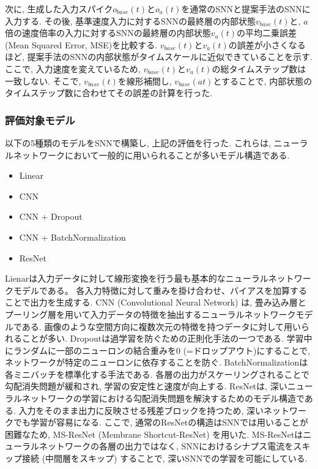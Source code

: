 次に, 生成した入力スパイク$o_{base}(t)$と$o_a(t)$を通常のSNNと提案手法のSNNに入力する.
その後, 基準速度入力に対するSNNの最終層の内部状態$v_{base}(t)$と, $a$倍の速度倍率の入力に対するSNNの最終層の内部状態$v_a(t)$の平均二乗誤差 (Mean Squared Error, MSE)を比較する.
$v_{base}(t)$と$v_a(t)$の誤差が小さくなるほど, 提案手法のSNNの内部状態がタイムスケールに近似できていることを示す.
ここで, 入力速度を変えているため, $v_{base}(t)$と$v_a(t)$の総タイムステップ数は一致しない.
そこで, $v_{base}(t)$を線形補間し, $v_{base}(at)$とすることで, 内部状態のタイムステップ数に合わせてその誤差の計算を行った.

\subsubsection{評価対象モデル}
以下の5種類のモデルをSNNで構築し, 上記の評価を行った.
これらは, ニューラルネットワークにおいて一般的に用いられることが多いモデル構造である.
\begin{itemize}
    \item Linear
    \item CNN\cite{cnn}
    \item CNN + Dropout\cite{dropout}
    \item CNN + BatchNormalization\cite{batchnorm}
    \item ResNet\cite{resnet}
\end{itemize}
Lienarは入力データに対して線形変換を行う最も基本的なニューラルネットワークモデルである。
各入力特徴に対して重みを掛け合わせ、バイアスを加算することで出力を生成する.
CNN (Convolutional Neural Network) は, 畳み込み層とプーリング層を用いて入力データの特徴を抽出するニューラルネットワークモデルである.
画像のような空間方向に複数次元の特徴を持つデータに対して用いられることが多い.
Dropoutは過学習を防ぐための正則化手法の一つである.
学習中にランダムに一部のニューロンの結合重みを0 (=ドロップアウト)にすることで, ネットワークが特定のニューロンに依存することを防ぐ.
BatchNormalizationは各ミニバッチを標準化する手法である.
各層の出力がスケーリングされることで勾配消失問題が緩和され, 学習の安定性と速度が向上する.
ResNetは, 深いニューラルネットワークの学習における勾配消失問題を解決するためのモデル構造である.
入力をそのまま出力に反映させる残差ブロックを持つため, 深いネットワークでも学習が容易になる.
ここで, 通常のResNetの構造はSNNでは用いることが困難なため, MS-ResNet (Membrane Shortcut-ResNet)\cite{msresnet} を用いた.
MS-ResNetはニューラルネットワークの各層の出力ではなく, SNNにおけるシナプス電流をスキップ接続 (中間層をスキップ) することで, 深いSNNでの学習を可能にしている.

